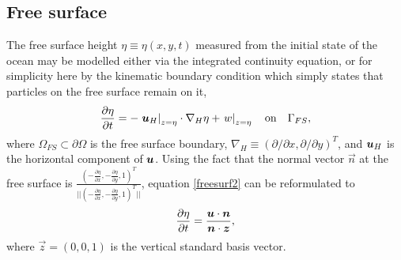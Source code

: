\subsection{Free surface}\label{Sect:FS}
The free surface height $\eta\equiv\eta(x,y,t)$ measured from the initial state of the ocean
may be modelled either via the integrated continuity equation,
or for simplicity here by the kinematic boundary condition which simply states
that particles on the free surface remain on it, \ie
\begin{equation}\label{freesurf2}
\frac{\partial \eta}{\partial t}=-\left.{{\mbox{\boldmath$u$}}}_H\right|_{z=\eta}\cdot\nabla_H \eta +\left.w\right|_{z=\eta} \quad \textrm{on}\quad \Gamma_{FS},
\end{equation}
where $\Omega_{FS}\subset \partial \Omega$ is the free surface boundary, $\nabla_H\equiv(\partial/\partial x,\partial/\partial y)^T$, and
${\mbox{\boldmath$u$}}_H$ is the horizontal component of ${\mbox{\boldmath$u$}}$. Using the fact that the normal vector $\vec n$ at the free surface is $\frac{(-\frac{\partial \eta}{\partial x},-\frac{\partial \eta}{\partial y}, 1)^T}{||(-\frac{\partial \eta}{\partial x},-\frac{\partial \eta}{\partial y}, 1)^T||}$, equation \eqref{freesurf2} can be reformulated to
\begin{equation}\label{freesurf3}
\frac{\partial \eta}{\partial t}=\frac{{\mbox{\boldmath$u$}} \cdot {\mbox{\boldmath$n$}}}{{\mbox{\boldmath$n$}} \cdot {\mbox{\boldmath$z$}}},
\end{equation}
where $\vec z=(0,0,1)$ is the vertical standard basis vector.
